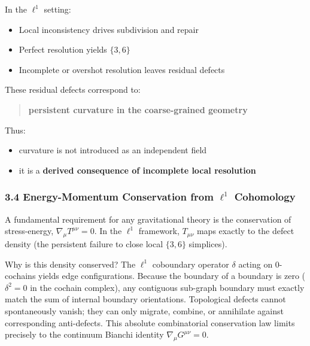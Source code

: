\documentclass[
]{article}
\providecommand{\tightlist}{%
  \setlength{\itemsep}{0pt}\setlength{\parskip}{0pt}}
\begin{document}
In the \(\ell^1\) setting:

\begin{itemize}
\tightlist
\item
  Local inconsistency drives subdivision and repair
\item
  Perfect resolution yields \(\{3,6\}\)
\item
  Incomplete or overshot resolution leaves residual defects
\end{itemize}

These residual defects correspond to:

\begin{quote}
\textbf{persistent curvature in the coarse-grained geometry}
\end{quote}

Thus:

\begin{itemize}
\tightlist
\item
  curvature is not introduced as an independent field
\item
  it is a \textbf{derived consequence of incomplete local resolution}
\end{itemize}

\hypertarget{energy-momentum-conservation-from-ell1-cohomology}{%
\subsubsection{\texorpdfstring{3.4 Energy-Momentum Conservation from
\(\ell^1\)
Cohomology}{3.4 Energy-Momentum Conservation from \textbackslash ell\^{}1 Cohomology}}\label{energy-momentum-conservation-from-ell1-cohomology}}

A fundamental requirement for any gravitational theory is the
conservation of stress-energy, \(\nabla_\mu T^{\mu\nu} = 0\). In the
\(\ell^1\) framework, \(T_{\mu\nu}\) maps exactly to the defect density
(the persistent failure to close local \(\{3,6\}\) simplices).

Why is this density conserved? The \(\ell^1\) coboundary operator
\(\delta\) acting on 0-cochains yields edge configurations. Because the
boundary of a boundary is zero (\(\delta^2 = 0\) in the cochain
complex), any contiguous sub-graph boundary must exactly match the sum
of internal boundary orientations. Topological defects cannot
spontaneously vanish; they can only migrate, combine, or annihilate
against corresponding anti-defects. This absolute combinatorial
conservation law limits precisely to the continuum Bianchi identity
\(\nabla_\mu G^{\mu\nu} = 0\).
\end{document}
